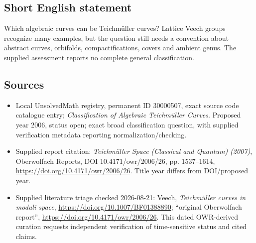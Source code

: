 \documentclass[11pt]{article}
\begin{document}
\subsection{Short English statement}
Which algebraic curves can be Teichm\"uller curves? Lattice Veech groups recognize many examples, but the question still needs a convention about abstract curves, orbifolds, compactifications, covers and ambient genus. The supplied assessment reports no complete general classification.
\subsection{Sources}
\begin{itemize}
\item Local UnsolvedMath registry, permanent ID 30000507, exact source code catalogue entry; \emph{Classification of Algebraic Teichm\"uller Curves}. Proposed year 2006, status open; exact broad classification question, with supplied verification metadata reporting normalization/checking.
\item Supplied report citation: \emph{Teichm\"uller Space (Classical and Quantum) (2007)}, Oberwolfach Reports, DOI 10.4171/owr/2006/26, pp. 1537--1614, \url{https://doi.org/10.4171/owr/2006/26}. Title year differs from DOI/proposed year.
\item Supplied literature triage checked 2026-08-21: Veech, \emph{Teichm\"uller curves in moduli space}, \url{https://doi.org/10.1007/BF01388890}; ``original Oberwolfach report'', \url{https://doi.org/10.4171/owr/2006/26}. This dated OWR-derived curation requests independent verification of time-sensitive status and cited claims.
\end{itemize}
\end{document}
